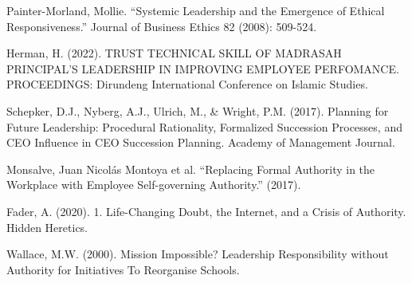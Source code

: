 \documentclass[runningheads]{llncs}
\begin{document}

%
%
%
% 
% 
%
\begin{thebibliography}{10}




Painter-Morland, Mollie. “Systemic Leadership and the Emergence of Ethical Responsiveness.” Journal of Business Ethics 82 (2008): 509-524.

Herman, H. (2022). TRUST TECHNICAL SKILL OF MADRASAH PRINCIPAL’S LEADERSHIP IN IMPROVING EMPLOYEE PERFOMANCE. PROCEEDINGS: Dirundeng International Conference on Islamic Studies.

Schepker, D.J., Nyberg, A.J., Ulrich, M., \& Wright, P.M. (2017). Planning for Future Leadership: Procedural Rationality, Formalized Succession Processes, and CEO Influence in CEO Succession Planning. Academy of Management Journal.

Monsalve, Juan Nicolás Montoya et al. “Replacing Formal Authority in the Workplace with Employee Self-governing Authority.” (2017).

Fader, A. (2020). 1. Life-Changing Doubt, the Internet, and a Crisis of Authority. Hidden Heretics.

Wallace, M.W. (2000). Mission Impossible? Leadership Responsibility without Authority for Initiatives To Reorganise Schools.


\end{thebibliography}
\end{document}
